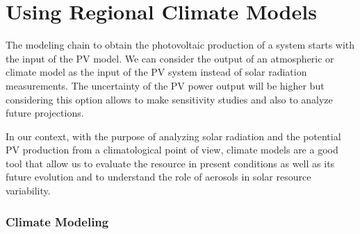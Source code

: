 

\section{Using Regional Climate Models}

The modeling chain to obtain the photovoltaic production of a system starts with the input of the PV model. We can consider the output of an atmospheric or climate model as the input of the PV system instead of solar radiation measurements. The uncertainty of the PV power output will be higher but considering this option allows to make sensitivity studies and also to analyze future projections.
 

In our context, with the purpose of analyzing solar radiation and the potential PV production from a climatological point of view, climate models are a good tool that allow us to evaluate the resource in present conditions as well as its future evolution and to understand the role of aerosols in solar resource variability.

\subsubsection{Climate Modeling}

